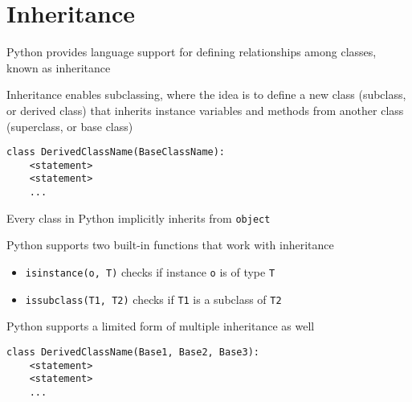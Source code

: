\documentclass[8pt,a4paper,compress]{beamer}
\begin{document}
\section{Inheritance}
\begin{frame}[fragile]
\pause

Python provides language support for defining relationships among classes, known as inheritance

\pause
\bigskip

Inheritance enables subclassing, where the idea is to define a new class (subclass, or derived class) that inherits instance variables and methods from another class (superclass, or base class)

\begin{lstlisting}[language={}]
class DerivedClassName(BaseClassName):
    <statement>
    <statement>
    ...
\end{lstlisting}

\pause
\bigskip

Every class in Python implicitly inherits from \lstinline{object}

\pause
\bigskip

Python supports two built-in functions that work with inheritance
\begin{itemize}
\item \lstinline{isinstance(o, T)} checks if instance \lstinline{o} is of type \lstinline{T}
\item \lstinline{issubclass(T1, T2)} checks if \lstinline{T1} is a subclass of \lstinline{T2}
\end{itemize}

\pause
\bigskip

Python supports a limited form of multiple inheritance as well

\begin{lstlisting}[language={}]
class DerivedClassName(Base1, Base2, Base3):
    <statement>
    <statement>
    ...
\end{lstlisting}
\end{frame}
\end{document}
